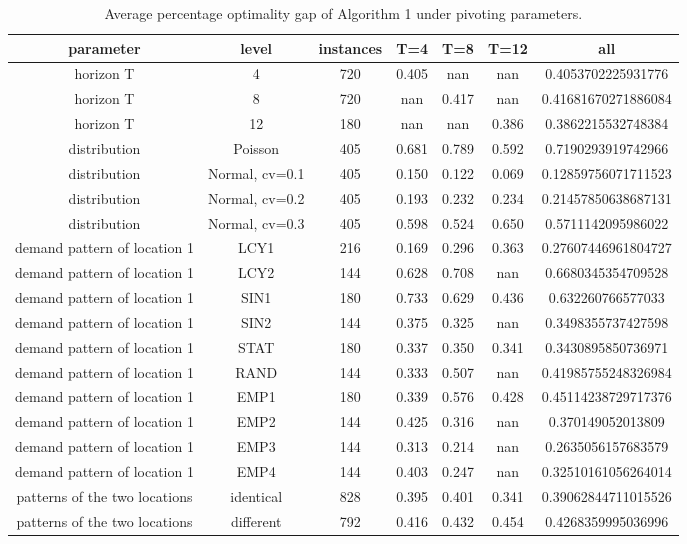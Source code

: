 \begin{table}[H]
\centering
\caption{Average percentage optimality gap of Algorithm 1 under pivoting parameters.}
\label{tab:test2_pivot}
\begin{tabular}{ccccccc}
\toprule
parameter & level & instances & T=4 & T=8 & T=12 & all \\
\midrule
horizon T & 4 & 720 & 0.405 & nan & nan & 0.4053702225931776 \\
horizon T & 8 & 720 & nan & 0.417 & nan & 0.41681670271886084 \\
horizon T & 12 & 180 & nan & nan & 0.386 & 0.3862215532748384 \\
distribution & Poisson & 405 & 0.681 & 0.789 & 0.592 & 0.7190293919742966 \\
distribution & Normal, cv=0.1 & 405 & 0.150 & 0.122 & 0.069 & 0.12859756071711523 \\
distribution & Normal, cv=0.2 & 405 & 0.193 & 0.232 & 0.234 & 0.21457850638687131 \\
distribution & Normal, cv=0.3 & 405 & 0.598 & 0.524 & 0.650 & 0.5711142095986022 \\
demand pattern of location 1 & LCY1 & 216 & 0.169 & 0.296 & 0.363 & 0.27607446961804727 \\
demand pattern of location 1 & LCY2 & 144 & 0.628 & 0.708 & nan & 0.6680345354709528 \\
demand pattern of location 1 & SIN1 & 180 & 0.733 & 0.629 & 0.436 & 0.632260766577033 \\
demand pattern of location 1 & SIN2 & 144 & 0.375 & 0.325 & nan & 0.3498355737427598 \\
demand pattern of location 1 & STAT & 180 & 0.337 & 0.350 & 0.341 & 0.3430895850736971 \\
demand pattern of location 1 & RAND & 144 & 0.333 & 0.507 & nan & 0.41985755248326984 \\
demand pattern of location 1 & EMP1 & 180 & 0.339 & 0.576 & 0.428 & 0.45114238729717376 \\
demand pattern of location 1 & EMP2 & 144 & 0.425 & 0.316 & nan & 0.370149052013809 \\
demand pattern of location 1 & EMP3 & 144 & 0.313 & 0.214 & nan & 0.2635056157683579 \\
demand pattern of location 1 & EMP4 & 144 & 0.403 & 0.247 & nan & 0.32510161056264014 \\
patterns of the two locations & identical & 828 & 0.395 & 0.401 & 0.341 & 0.39062844711015526 \\
patterns of the two locations & different & 792 & 0.416 & 0.432 & 0.454 & 0.4268359995036996 \\

\end{tabular}
\end{table}
